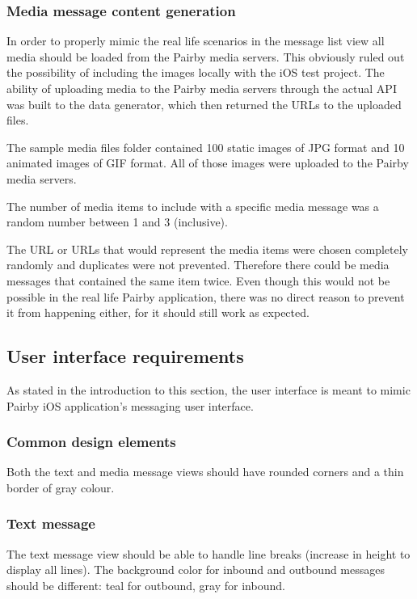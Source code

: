 \documentclass[a4paper,12pt]{article}
\begin{document}
\subsubsection*{Media message content generation}
In order to properly mimic the real life scenarios in the message list view all media should be loaded from the Pairby media servers.
This obviously ruled out the possibility of including the images locally with the iOS test project. The ability of uploading media
to the Pairby media servers through the actual API was built to the data generator, which then returned the URLs to the uploaded files.

The sample media files folder contained 100 static images of JPG format and 10 animated images of GIF format. All of those images were uploaded
to the Pairby media servers.

The number of media items to include with a specific media message was a random number between 1 and 3 (inclusive).

The URL or URLs that would represent the media items were chosen completely randomly and duplicates were not prevented. Therefore there
could be media messages that contained the same item twice. Even though this would not be possible in the real life Pairby application,
there was no direct reason to prevent it from happening either, for it should still work as expected.

\subsection{User interface requirements}
As stated in the introduction to this section, the user interface is meant to mimic Pairby iOS application's messaging
user interface.

\subsubsection*{Common design elements}
Both the text and media message views should have rounded corners and a thin border of gray colour.

\subsubsection{Text message}
The text message view should be able to handle line breaks (increase in height to display all lines). The background
color for inbound and outbound messages should be different: teal for outbound, gray for inbound.
\end{document}
